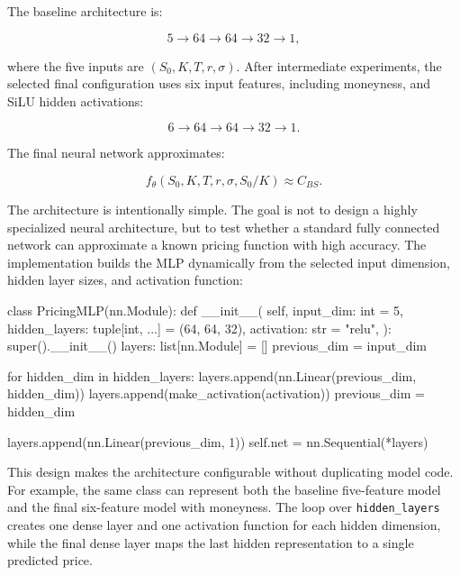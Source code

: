 The baseline architecture is:

\begin{equation}
    5 \rightarrow 64 \rightarrow 64 \rightarrow 32 \rightarrow 1,
\end{equation}

where the five inputs are $(S_0, K, T, r, \sigma)$.
After intermediate experiments, the selected final configuration uses six input features, including moneyness, and SiLU hidden activations:

\begin{equation}
    6 \rightarrow 64 \rightarrow 64 \rightarrow 32 \rightarrow 1.
\end{equation}

The final neural network approximates:

\begin{equation}
    f_\theta(S_0, K, T, r, \sigma, S_0/K) \approx C_{BS}.
\end{equation}

The architecture is intentionally simple.
The goal is not to design a highly specialized neural architecture, but to test whether a standard fully connected network can approximate a known pricing function with high accuracy.
The implementation builds the MLP dynamically from the selected input dimension, hidden layer sizes, and activation function:

\begin{projectlistingbox}
class PricingMLP(nn.Module):
    def __init__(
        self,
        input_dim: int = 5,
        hidden_layers: tuple[int, ...] = (64, 64, 32),
        activation: str = "relu",
    ):
        super().__init__()
        layers: list[nn.Module] = []
        previous_dim = input_dim

        for hidden_dim in hidden_layers:
            layers.append(nn.Linear(previous_dim, hidden_dim))
            layers.append(make_activation(activation))
            previous_dim = hidden_dim

        layers.append(nn.Linear(previous_dim, 1))
        self.net = nn.Sequential(*layers)
\end{projectlistingbox}

This design makes the architecture configurable without duplicating model code.
For example, the same class can represent both the baseline five-feature model and the final six-feature model with moneyness.
The loop over \texttt{hidden\_layers} creates one dense layer and one activation function for each hidden dimension, while the final dense layer maps the last hidden representation to a single predicted price.

